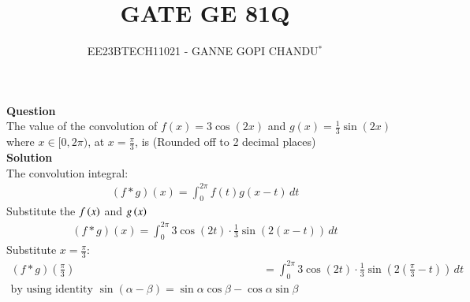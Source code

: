 \documentclass[journal,12pt,onecolumn]{IEEEtran}
\theoremstyle{remark}
\begin{document}

\vspace{3cm}
\title{GATE GE 81Q}
\author{EE23BTECH11021 - GANNE GOPI CHANDU$^{*}$%
}
\maketitle
\bigskip
\renewcommand{\thefigure}{\theenumi}
\renewcommand{\thetable}{\theenumi}

\textbf{Question}\\
The value of the convolution of $f(x) = 3\cos(2x)$ and $g(x) = \frac{1}{3}\sin(2x)$ where $x \in [0, 2\pi)$, at $x = \frac{\pi}{3}$, is (Rounded off to 2 decimal places)\\
\textbf{Solution}\\
The convolution integral:
\begin{align}
    (f * g)(x) = \int_{0}^{2\pi} f(t) g(x - t) \, dt
\end{align}
Substitute the $f\left(x\right)$ and $g\left(x\right)$\\
\begin{align}
    (f * g)(x) = \int_{0}^{2\pi} 3\cos(2t) \cdot \frac{1}{3}\sin(2(x - t)) \, dt
\end{align}
Substitute $x = \frac{\pi}{3}$:
\begin{align}
    (f * g)\left(\frac{\pi}{3}\right) &= \int_{0}^{2\pi} 3\cos(2t) \cdot \frac{1}{3}\sin\left(2\left(\frac{\pi}{3} - t\right)\right) \, dt\\
    \text{by using identity $\sin(\alpha - \beta) = \sin\alpha\cos\beta - \cos\alpha\sin\beta$}\\
\end{align}
\end{document}
